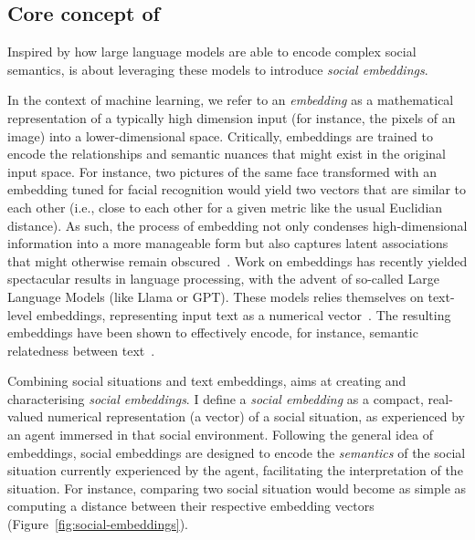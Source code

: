 \subsection{Core concept of \project}

Inspired by how large language models are able to encode complex social
semantics, \project is about leveraging these models to introduce
\emph{social embeddings}.

In the context of machine learning, we refer to an \emph{embedding} as a
mathematical representation of a typically high dimension input (for
instance, the pixels of an image) into a lower-dimensional space. Critically, embeddings are
trained to encode the relationships and semantic nuances that might exist in the
original input space. For instance, two pictures of the same face transformed
with an embedding tuned for facial recognition would yield two vectors that are
similar to each other (i.e., close to each other for a given metric like the
usual Euclidian distance). As such, the process of embedding not only condenses
high-dimensional information into a more manageable form but also captures
latent associations that might otherwise remain
obscured~\cite{bengio2009learning}. Work on embeddings has recently yielded
spectacular results in language processing, with the advent of so-called Large
Language Models (like Llama or GPT). These models relies themselves on
text-level embeddings, representing input text as a numerical
vector~\cite{reimers2019sentencebert,muennighoff2022sgpt}. The resulting
embeddings have been shown to effectively encode, for instance, semantic
relatedness between text~\cite{thakur2021beir}.

Combining social situations and text embeddings, \project aims at creating and
characterising \emph{social embeddings}. I define a \emph{social embedding} as a
compact, real-valued numerical representation (a vector) of a social situation,
as experienced by an agent immersed in that social environment. Following the
general idea of embeddings, social embeddings are designed to encode the
\emph{semantics} of the social situation currently experienced by the agent,
facilitating the interpretation of the situation. For instance, comparing two
social situation would become as simple as computing a distance between their
respective embedding vectors (Figure~\ref{fig:social-embeddings}).

